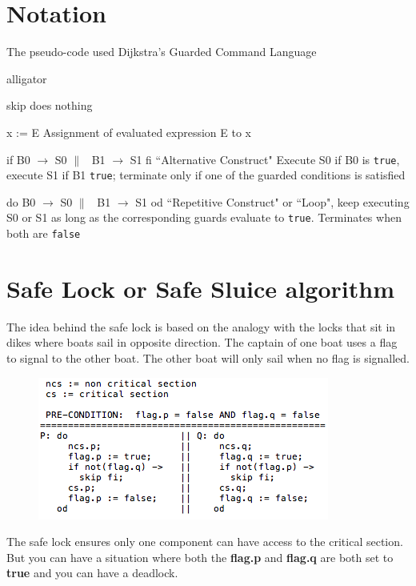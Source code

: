 \documentclass[18pt]{extarticle}
\begin{document}
\section*{Notation}

The pseudo-code used Dijkstra's Guarded Command Language

\begin{labeling}{alligator}
\item [skip] does nothing
\item [x := E] Assignment of evaluated expression E to x
\item [if B0 $\rightarrow$ S0 $\|$ \ B1 $\rightarrow$ S1 fi] ``Alternative Construct" Execute S0 if B0 is \texttt{true}, execute S1 if B1 \texttt{true}; terminate only if one of the guarded conditions is satisfied
\item [do B0 $\rightarrow$ S0 $\|$ \ B1 $\rightarrow$ S1 od]``Repetitive Construct" or ``Loop", keep executing S0 or S1 as long as the corresponding guards evaluate to \texttt{true}. Terminates when both are \texttt{false}
\end{labeling}

\newpage

\section*{Safe Lock or Safe Sluice algorithm}

The idea behind the safe lock is based on the analogy with the locks that sit in dikes where boats sail in opposite direction. The captain of one boat uses a flag to signal to the other boat. The other boat will only sail when no flag is signalled.
\newline

\begin{figure}[h]
  \includegraphics[scale=0.7]{safelock}
  \label{fig: safe-lock algorithm}
\end{figure}



The safe lock ensures only one component can have access to the critical section. But you can have a situation where both the \textbf{flag.p} and \textbf{flag.q} are both set to \textbf{true} and you can have a deadlock. \newline 
\end{document}

